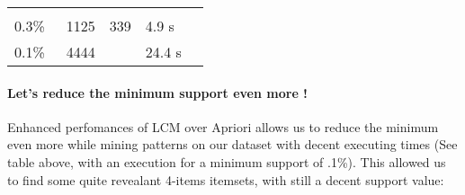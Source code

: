 \documentclass[11pt]{article}
\begin{document}
\begin{longtable}[]{@{}lllll@{}}
\begin{minipage}[t]{0.13\columnwidth}
\strut
\end{minipage}\tabularnewline
\begin{minipage}[t]{0.14\columnwidth}\raggedright
0.3\%\strut
\end{minipage} & \begin{minipage}[t]{0.18\columnwidth}\raggedright
~1125\strut
\end{minipage} & \begin{minipage}[t]{0.20\columnwidth}\raggedright
339\strut
\end{minipage} & \begin{minipage}[t]{0.20\columnwidth}\raggedright
4.9 s\strut
\end{minipage} & \begin{minipage}[t]{0.13\columnwidth}\raggedright
\strut
\end{minipage}\tabularnewline
\begin{minipage}[t]{0.14\columnwidth}\raggedright
0.1\%\strut
\end{minipage} & \begin{minipage}[t]{0.18\columnwidth}\raggedright
~4444\strut
\end{minipage} & \begin{minipage}[t]{0.20\columnwidth}\raggedright
\strut
\end{minipage} & \begin{minipage}[t]{0.20\columnwidth}\raggedright
24.4 s\strut
\end{minipage} & \begin{minipage}[t]{0.13\columnwidth}\raggedright
\strut
\end{minipage}\tabularnewline
\bottomrule
\end{longtable}

\hypertarget{lets-reduce-the-minimum-support-even-more}{%
\paragraph{Let's reduce the minimum support even more
!}\label{lets-reduce-the-minimum-support-even-more}}

Enhanced perfomances of LCM over Apriori allows us to reduce the minimum
even more while mining patterns on our dataset with decent executing
times (See table above, with an execution for a minimum support of
.1\%). This allowed us to find some quite revealant 4-items itemsets,
with still a decent support value:
\end{document}
